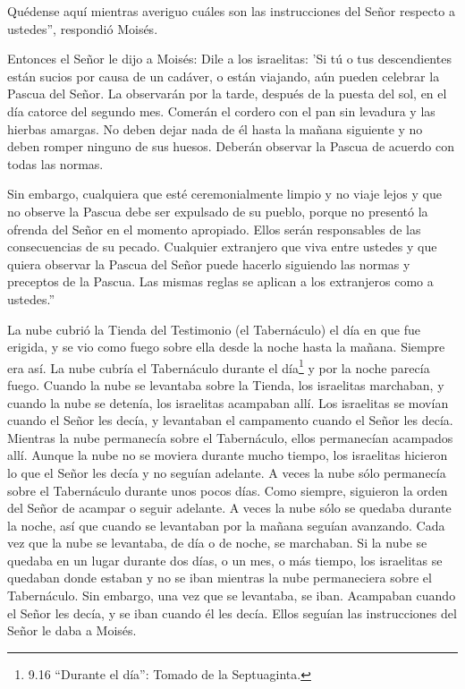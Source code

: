  Quédense aquí mientras averiguo cuáles son las
instrucciones del Señor respecto a ustedes'', respondió Moisés.

 Entonces el Señor le dijo a Moisés:  Dile a
los israelitas: 'Si tú o tus descendientes están sucios por causa de un
cadáver, o están viajando, aún pueden celebrar la Pascua del Señor.
 La observarán por la tarde, después de la puesta del sol,
en el día catorce del segundo mes. Comerán el cordero con el pan sin
levadura y las hierbas amargas.  No deben dejar nada de él
hasta la mañana siguiente y no deben romper ninguno de sus huesos.
Deberán observar la Pascua de acuerdo con todas las normas.

 Sin embargo, cualquiera que esté ceremonialmente limpio y
no viaje lejos y que no observe la Pascua debe ser expulsado de su
pueblo, porque no presentó la ofrenda del Señor en el momento apropiado.
Ellos serán responsables de las consecuencias de su pecado.
 Cualquier extranjero que viva entre ustedes y que quiera
observar la Pascua del Señor puede hacerlo siguiendo las normas y
preceptos de la Pascua. Las mismas reglas se aplican a los extranjeros
como a ustedes.''

 La nube cubrió la Tienda del Testimonio (el Tabernáculo)
el día en que fue erigida, y se vio como fuego sobre ella desde la noche
hasta la mañana.  Siempre era así. La nube cubría el
Tabernáculo durante el día\footnote{9.16 ``Durante el día'': Tomado de
  la Septuaginta.} y por la noche parecía fuego.  Cuando la
nube se levantaba sobre la Tienda, los israelitas marchaban, y cuando la
nube se detenía, los israelitas acampaban allí.  Los
israelitas se movían cuando el Señor les decía, y levantaban el
campamento cuando el Señor les decía. Mientras la nube permanecía sobre
el Tabernáculo, ellos permanecían acampados allí.  Aunque
la nube no se moviera durante mucho tiempo, los israelitas hicieron lo
que el Señor les decía y no seguían adelante.  A veces la
nube sólo permanecía sobre el Tabernáculo durante unos pocos días. Como
siempre, siguieron la orden del Señor de acampar o seguir adelante.
 A veces la nube sólo se quedaba durante la noche, así que
cuando se levantaban por la mañana seguían avanzando. Cada vez que la
nube se levantaba, de día o de noche, se marchaban.  Si la
nube se quedaba en un lugar durante dos días, o un mes, o más tiempo,
los israelitas se quedaban donde estaban y no se iban mientras la nube
permaneciera sobre el Tabernáculo. Sin embargo, una vez que se
levantaba, se iban.  Acampaban cuando el Señor les decía, y
se iban cuando él les decía. Ellos seguían las instrucciones del Señor
le daba a Moisés.

